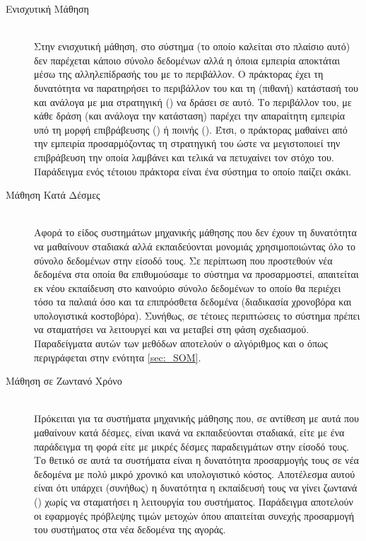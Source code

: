 \begin{description}
    \item[Ενισχυτική Μάθηση] \hfill \\ Στην ενισχυτική μάθηση, στο σύστημα (το οποίο καλείται  στο πλαίσιο αυτό) δεν παρέχεται κάποιο σύνολο δεδομένων αλλά η όποια εμπειρία αποκτάται μέσω της αλληλεπίδρασής του με το περιβάλλον. Ο πράκτορας έχει τη δυνατότητα να παρατηρήσει το περιβάλλον του και τη (πιθανή) κατάστασή του και ανάλογα με μια στρατηγική () να δράσει σε αυτό. Το περιβάλλον του, με κάθε δράση (και ανάλογα την κατάσταση) παρέχει την απαραίτητη εμπειρία υπό τη μορφή επιβράβευσης () ή ποινής (). Έτσι, ο πράκτορας μαθαίνει από την εμπειρία προσαρμόζοντας τη στρατηγική του ώστε να μεγιστοποιεί την επιβράβευση την οποία λαμβάνει και τελικά να πετυχαίνει τον στόχο του. Παράδειγμα ενός τέτοιου πράκτορα είναι ένα σύστημα το οποίο παίζει σκάκι.

    \item[Μάθηση Κατά Δέσμες] \hfill \\ Αφορά το είδος συστημάτων μηχανικής μάθησης που δεν έχουν τη δυνατότητα να μαθαίνουν σταδιακά αλλά εκπαιδεύονται μονομιάς χρησιμοποιώντας όλο το σύνολο δεδομένων στην είσοδό τους. Σε περίπτωση που προστεθούν νέα δεδομένα στα οποία θα επιθυμούσαμε το σύστημα να προσαρμοστεί, απαιτείται εκ νέου εκπαίδευση στο καινούριο σύνολο δεδομένων το οποίο θα περιέχει τόσο τα παλαιά όσο και τα επιπρόσθετα δεδομένα (διαδικασία χρονοβόρα και υπολογιστικά κοστοβόρα). Συνήθως, σε τέτοιες περιπτώσεις το σύστημα πρέπει να σταματήσει να λειτουργεί και να μεταβεί στη φάση σχεδιασμού. Παραδείγματα αυτών των μεθόδων αποτελούν ο αλγόριθμος  και ο  όπως περιγράφεται στην ενότητα \ref{sec:_SOM}.
    
    \item[Μάθηση σε Ζωντανό Χρόνο] \hfill \\ Πρόκειται για τα συστήματα μηχανικής μάθησης που, σε αντίθεση με αυτά που μαθαίνουν κατά δέσμες, είναι ικανά να εκπαιδεύονται σταδιακά, είτε με ένα παράδειγμα τη φορά είτε με μικρές δέσμες παραδειγμάτων στην είσοδό τους. Το θετικό σε αυτά τα συστήματα είναι η δυνατότητα προσαρμογής τους σε νέα δεδομένα με πολύ μικρό χρονικό και υπολογιστικό κόστος. Αποτέλεσμα αυτού είναι ότι υπάρχει (συνήθως) η δυνατότητα η εκπαίδευσή τους να γίνει ζωντανά () χωρίς να σταματήσει η λειτουργία του συστήματος. Παράδειγμα αποτελούν οι εφαρμογές πρόβλεψης τιμών μετοχών όπου απαιτείται συνεχής προσαρμογή του συστήματος στα νέα δεδομένα της αγοράς. 
    

\end{description}
